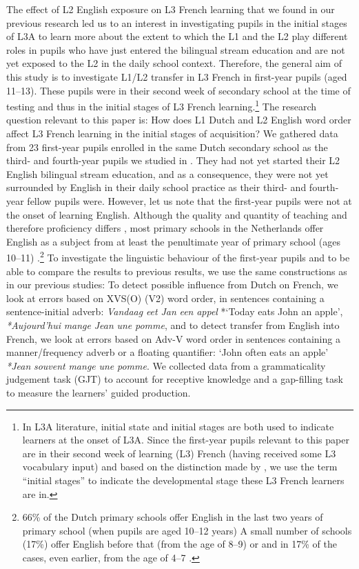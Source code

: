 \documentclass[output=paper]{langsci/langscibook}
\begin{document}
The effect of L2 English exposure on L3 French learning that we found in our previous research led us to an interest in investigating pupils in the initial stages of L3A to learn more about the extent to which the L1 and the L2 play different roles in pupils who have just entered the bilingual stream education and are not yet exposed to the L2 in the daily school context. Therefore, the general aim of this study is to investigate L1/L2 transfer in L3 French in first-year pupils (aged 11–13). These pupils were in their second week of secondary school at the time of testing and thus in the initial stages of L3 French learning.\footnote{In L3A literature, initial state and initial stages are both used to indicate learners at the onset of L3A. Since the first-year pupils relevant to this paper are in their second week of learning (L3) French (having received some L3 vocabulary input) and based on the distinction made by \citet{GarciaMayoRothman2012}, we use the term ``initial stages'' to indicate the developmental stage these L3 French learners are in.} The research question relevant to this paper is: How does L1 Dutch and L2 English word order affect L3 French learning in the initial stages of acquisition? We gathered data from 23 first-year pupils enrolled in the same Dutch secondary school as the third- and fourth-year pupils we studied in \citet{StadtEtAl2016, StadtEtAl2018Exposure}. They had not yet started their L2 English bilingual stream education, and as a consequence, they were not yet surrounded by English in their daily school practice as their third- and fourth-year fellow pupils were. However, let us note that the first-year pupils were not at the onset of learning English. Although the quality and quantity of teaching and therefore proficiency differs \citep{UnsworthEtAl2015}, most primary schools in the Netherlands offer English as a subject from at least the penultimate year of primary school (ages 10–11) \citep{Rose2016}.\footnote{66\% of the Dutch primary schools offer English in the last two years of primary school (when pupils are aged 10–12 years) A small number of schools (17\%) offer English before that (from the age of 8–9) or and in 17\% of the cases, even earlier, from the age of 4–7 \citep{ThijsEtAl2011}.} To investigate the linguistic behaviour of the first-year pupils and to be able to compare the results to previous results, we use the same constructions as in our previous studies: To detect possible influence from Dutch on French, we look at errors based on XVS(O) (V2) word order, in sentences containing a sentence-initial adverb: \textit{Vandaag} {\textit{eet}} \textit{Jan} \textit{een} \textit{appel} *‘Today {eats} John an apple’, \textit{*Aujourd’hui} {\textit{mange}} \textit{Jean} \textit{une} \textit{pomme}, and to detect transfer from English into French, we look at errors based on Adv-V word order in sentences containing a manner/frequency adverb or a floating quantifier: ‘John often {eats} an apple’ \textit{*Jean} \textit{souvent} {\textit{mange}} \textit{une} \textit{pomme}. We collected data from a grammaticality judgement task (GJT) to account for receptive knowledge and a gap-filling task to measure the learners’ guided production.
\end{document}

